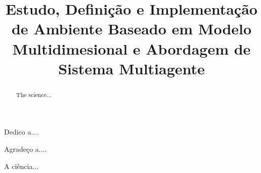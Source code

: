 \documentclass[bacharelado]{unb-cic}
\title{Estudo, Definição e Implementação de Ambiente Baseado em Modelo Multidimesional e Abordagem de Sistema Multiagente}
\begin{document}
  \maketitle
  \pretextual

  \begin{dedicatoria}
  Dedico a....
  \end{dedicatoria}

  \begin{agradecimentos}
  Agradeço a....
  \end{agradecimentos}

  \begin{resumo}
  A ciência...
  \end{resumo}

  \begin{abstract}
  The science...
  \end{abstract}

  \tableofcontents
  \listoffigures
  \listoftables

  \textual
  
  
  
  
  


  \postextual
  
  
\end{document}
